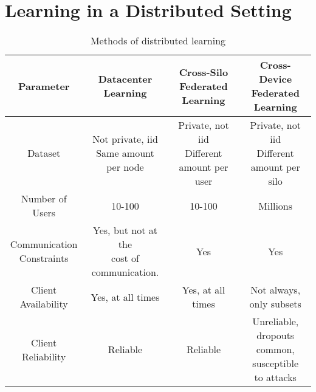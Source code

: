 \documentclass[twoside]{article}
\begin{document}
\section{Learning in a Distributed Setting}

\begin{table}[!ht]
    \centering
    \begin{tabular}{|c|c|c|c|}
        \hline
        \textbf{Parameter} & \textbf{Datacenter Learning} & \makecell{\textbf{Cross-Silo}\\\textbf{Federated Learning}} & \makecell{\textbf{Cross-Device}\\\textbf{Federated Learning}} \\
        \hline
        Dataset & \makecell{Not private, iid\\Same amount per node} & \makecell{Private, not iid\\Different amount per user} & \makecell{Private, not iid\\Different amount per silo} \\
        \hline
        Number of Users & 10-100 & 10-100 & Millions \\
        \hline
        \makecell{Communication\\Constraints} & \makecell{Yes, but not at the\\cost of communication.} & Yes & Yes \\
        \hline
        \makecell{Client\\Availability} & Yes, at all times & Yes, at all times & Not always, only subsets \\
        \hline
        \makecell{Client\\Reliability} & Reliable & Reliable & \makecell{Unreliable, dropouts\\common, susceptible\\to attacks} \\
        \hline
    \end{tabular}
    \caption{Methods of distributed learning}
    \label{tab:methods-dist}
\end{table}
\end{document}
